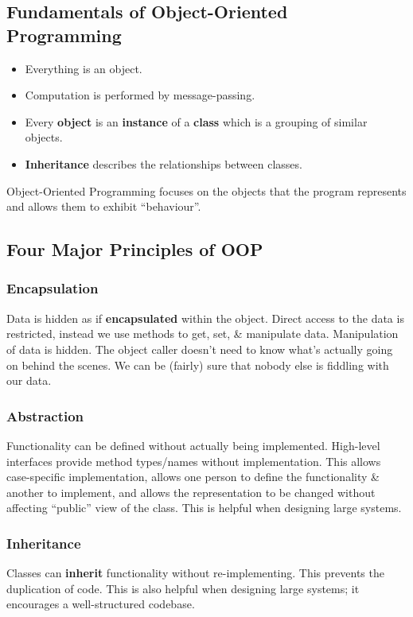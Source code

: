 \documentclass[a4paper,11pt]{article}
\begin{document}
\subsection{Fundamentals of Object-Oriented Programming}
\begin{itemize}
    \item   Everything is an object. 
    \item   Computation is performed by message-passing. 
    \item   Every \textbf{object} is an \textbf{instance} of a \textbf{class} which is a grouping of similar objects.
    \item   \textbf{Inheritance} describes the relationships between classes.
\end{itemize}

Object-Oriented Programming focuses on the objects that the program represents and allows them to exhibit ``behaviour''.

\subsection{Four Major Principles of OOP}
\subsubsection{Encapsulation}
Data is hidden as if \textbf{encapsulated} within the object. 
Direct access to the data is restricted, instead we use methods to get, set, \& manipulate data. 
Manipulation of data is hidden. 
The object caller doesn't need to know what's actually going on behind the scenes.
We can be (fairly) sure that nobody else is fiddling with our data.

\subsubsection{Abstraction}
Functionality can be defined without actually being implemented.
High-level interfaces provide method types/names without implementation. 
This allows case-specific implementation, allows one person to define the functionality \& another to implement, and
allows the representation to be changed without affecting ``public'' view of the class.
This is helpful when designing large systems. 

\subsubsection{Inheritance}
Classes can \textbf{inherit} functionality without re-implementing.
This prevents the duplication of code.
This is also helpful when designing large systems; it encourages a well-structured codebase.
\end{document}
